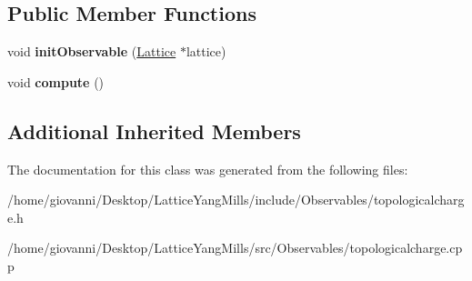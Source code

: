 \subsection*{Public Member Functions}
\begin{DoxyCompactItemize}
\item 
void {\bfseries init\+Observable} (\hyperlink{classLattice}{Lattice} $\ast$lattice)\hypertarget{classTopologicalCharge_a3738265d7e456997ba0ff57bcba55188}{}\label{classTopologicalCharge_a3738265d7e456997ba0ff57bcba55188}

\item 
void {\bfseries compute} ()\hypertarget{classTopologicalCharge_a67b19b74c8c4f981d37490623ca774f2}{}\label{classTopologicalCharge_a67b19b74c8c4f981d37490623ca774f2}

\end{DoxyCompactItemize}
\subsection*{Additional Inherited Members}


The documentation for this class was generated from the following files\+:\begin{DoxyCompactItemize}
\item 
/home/giovanni/\+Desktop/\+Lattice\+Yang\+Mills/include/\+Observables/topologicalcharge.\+h\item 
/home/giovanni/\+Desktop/\+Lattice\+Yang\+Mills/src/\+Observables/topologicalcharge.\+cpp\end{DoxyCompactItemize}
